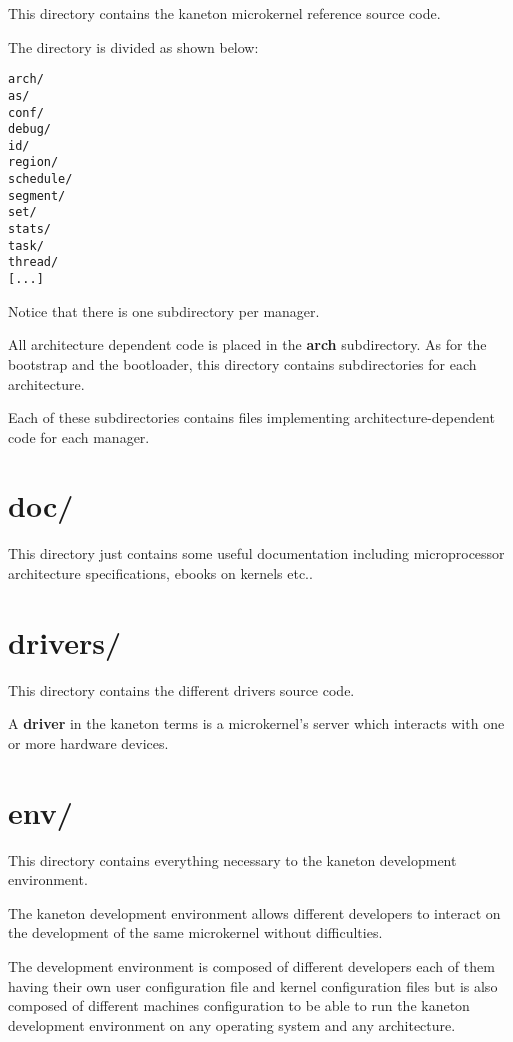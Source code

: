 This directory contains the kaneton microkernel reference source code.

The directory is divided as shown below:

\begin{verbatim}
arch/
as/
conf/
debug/
id/
region/
schedule/
segment/
set/
stats/
task/
thread/
[...]
\end{verbatim}

Notice that there is one subdirectory per manager.

All architecture dependent code is placed in the \textbf{arch} subdirectory.
As for the bootstrap and the bootloader, this directory contains
subdirectories for each architecture.

Each of these subdirectories contains files implementing
architecture-dependent code for each manager.

%
%

\section{doc/}

This directory just contains some useful documentation including
microprocessor architecture specifications, ebooks on kernels etc..

%
%

\section{drivers/}

This directory contains the different drivers source code.

A \textbf{driver} in the kaneton terms is a microkernel's server which
interacts with one or more hardware devices.

%
%

\section{env/}

This directory contains everything necessary to the kaneton
development environment.

The kaneton development environment allows different developers to
interact on the development of the same microkernel without difficulties.

The development environment is composed of different developers each
of them having their own user configuration file and kernel configuration
files but is also composed of different machines configuration to be able
to run the kaneton development environment on any operating system and any
architecture.

